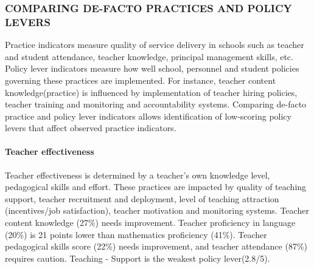 \documentclass[
  twocolumn]{article}
\begin{document}
\hypertarget{comparing-de-facto-practices-and-policy-levers}{%
\subsubsection{\texorpdfstring{\textbf{COMPARING DE-FACTO PRACTICES AND
POLICY
LEVERS}}{COMPARING DE-FACTO PRACTICES AND POLICY LEVERS}}\label{comparing-de-facto-practices-and-policy-levers}}

Practice indicators measure quality of service delivery in schools such
as teacher and student attendance, teacher knowledge, principal
management skills, etc. Policy lever indicators measure how well school,
personnel and student policies governing these practices are
implemented. For instance, teacher content knowledge(practice) is
influenced by implementation of teacher hiring policies, teacher
training and monitoring and accountability systems. Comparing de-facto
practice and policy lever indicators allows identification of
low-scoring policy levers that affect observed practice indicators.

\hypertarget{teacher-effectiveness}{%
\paragraph{\texorpdfstring{\textbf{Teacher
effectiveness}}{Teacher effectiveness}}\label{teacher-effectiveness}}

Teacher effectiveness is determined by a teacher's own knowledge level,
pedagogical skills and effort. These practices are impacted by quality
of teaching support, teacher recruitment and deployment, level of
teaching attraction (incentives/job satisfaction), teacher motivation
and monitoring systems. Teacher content knowledge (27\%) needs
improvement. Teacher proficiency in language (20\%) is 21 points lower
than mathematics proficiency (41\%). Teacher pedagogical skills score
(22\%) needs improvement, and teacher attendance (87\%) requires
caution. Teaching - Support is the weakest policy lever(2.8/5).
\end{document}
